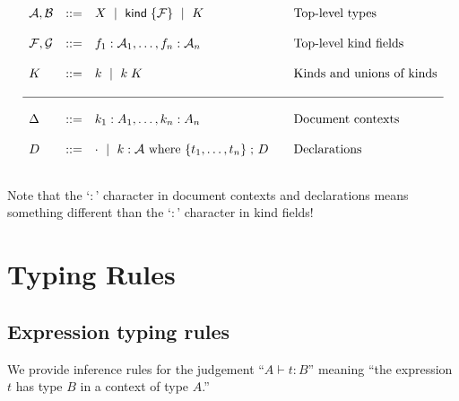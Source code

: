\documentclass{article}
\begin{document}
\[ \begin{array}{lclll}
\declType, \declTypeAlt
    &::= & X \| \kw{kind}\;\{ \declFields \} \| K
    &&\text{Top-level types} \\ \\
\declFields, \declFieldsAlt
    &::= & f_1 : \declType_1, \ldots, f_n : \declType_n
    &&\text{Top-level kind fields} \\ \\
K   &::= & k \|  k\;K
    &&\text{Kinds and unions of kinds} \\ \\
\hline \\
\declCtx%
    &::= & k_1 : A_1, \ldots, k_n : A_n
    &&\text{Document contexts} \\ \\
D   &::= & \cdot \| k : \declType \text{ where } \{t_1,\ldots,t_n\} \;;\, D
    &&\text{Declarations} \\ \\
\end{array} \]

Note that the `$:$' character in document contexts and declarations means something different than the `$:$' character in kind fields!



\section{Typing Rules}

\subsection{Expression typing rules}

We provide inference rules for the judgement ``$A \vdash t : B$'' meaning ``the expression $t$ has type $B$ in a context of type $A$.'' \\

\end{document}
